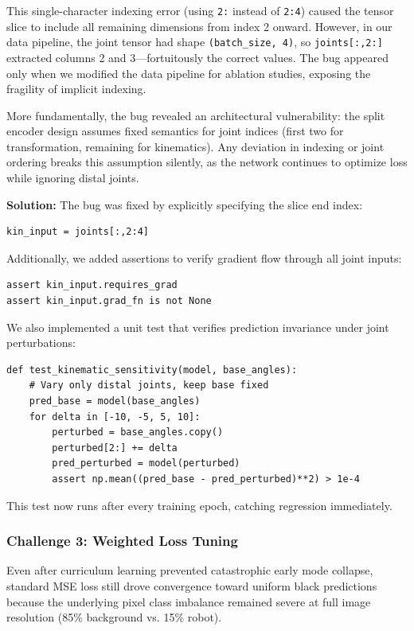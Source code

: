 \documentclass[12pt,a4paper,oneside]{report}
\begin{document}
This single-character indexing error (using \texttt{2:} instead of \texttt{2:4}) caused the tensor slice to include all remaining dimensions from index 2 onward. However, in our data pipeline, the joint tensor had shape \texttt{(batch\_size, 4)}, so \texttt{joints[:,2:]} extracted columns 2 and 3---fortuitously the correct values. The bug appeared only when we modified the data pipeline for ablation studies, exposing the fragility of implicit indexing.

More fundamentally, the bug revealed an architectural vulnerability: the split encoder design assumes fixed semantics for joint indices (first two for transformation, remaining for kinematics). Any deviation in indexing or joint ordering breaks this assumption silently, as the network continues to optimize loss while ignoring distal joints.

\textbf{Solution:} The bug was fixed by explicitly specifying the slice end index:
\begin{verbatim}
kin_input = joints[:,2:4]
\end{verbatim}

Additionally, we added assertions to verify gradient flow through all joint inputs:
\begin{verbatim}
assert kin_input.requires_grad
assert kin_input.grad_fn is not None
\end{verbatim}

We also implemented a unit test that verifies prediction invariance under joint perturbations:

\begin{verbatim}
def test_kinematic_sensitivity(model, base_angles):
    # Vary only distal joints, keep base fixed
    pred_base = model(base_angles)
    for delta in [-10, -5, 5, 10]:
        perturbed = base_angles.copy()
        perturbed[2:] += delta
        pred_perturbed = model(perturbed)
        assert np.mean((pred_base - pred_perturbed)**2) > 1e-4
\end{verbatim}

This test now runs after every training epoch, catching regression immediately.

\subsubsection{Challenge 3: Weighted Loss Tuning}

Even after curriculum learning prevented catastrophic early mode collapse, standard MSE loss still drove convergence toward uniform black predictions because the underlying pixel class imbalance remained severe at full image resolution (85\% background vs. 15\% robot).
\end{document}
